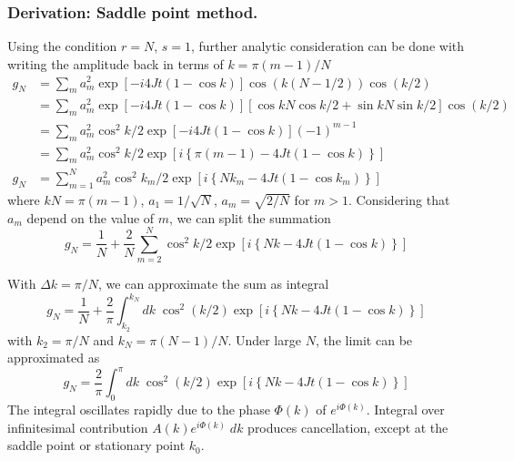 \documentclass[../../../main.tex]{subfiles}
\begin{document}
\subsubsection{Derivation: Saddle point method.}
Using the condition $r=N$, $s=1$, further analytic consideration can be done with writing the amplitude back in terms of $k = \pi(m-1)/N$
\begin{align*}
    g_N
     & = \sum_{m } a_m ^ 2 \exp \left[ -i4Jt(1 - \cos k) \right] \cos (k(N-1/2)) \cos (k/2)                                     \\
     & = \sum_{m } a_m ^ 2 \exp \left[ -i4Jt(1 - \cos k) \right] \left[ \cos kN \cos k/2 + \sin kN \sin k/2 \right]  \cos (k/2) \\
     & = \sum_{m } a_m ^ 2\cos^2 k/2 \exp \left[ -i4Jt(1 - \cos k) \right](-1)^{m-1}                                            \\
     & = \sum_{m } a_m ^ 2\cos^2 k/2 \exp \left[i \left\{\pi(m-1) - 4Jt (1-\cos k)  \right\}  \right]                           \\
    g_N
     & = \sum_{m =1} ^{N} a_m ^ 2\cos^2 k_m/2 \exp \left[i \left\{Nk_m - 4Jt (1-\cos k_m)  \right\}  \right]
\end{align*}
where $kN = \pi (m-1)$, $a_1 = 1/\sqrt{N}$, $a_m = \sqrt{2/N}$ for $m>1$.
Considering that $a_m$ depend on the value of $m$, we can split the summation
\begin{equation*}
    g_N = \frac{1}{N} + \frac{2 }{N }\sum_{m=2 } ^{N} \cos^2 k/2 \exp \left[i \left\{Nk - 4Jt (1-\cos k)  \right\}  \right]
\end{equation*}

With $\Delta k = \pi /N$, we can approximate the sum as integral
\begin{equation*}
    g_N = \frac{1 }{N} +  \frac{2}{\pi}\int_{k_2} ^{k_N} dk\;  \cos^2 (k/2) \exp \left[i \left\{Nk - 4Jt (1-\cos k)  \right\}  \right]
\end{equation*}
with  $k_\text{2} = \pi/N$ and $k_N = \pi(N-1)/N$.
Under large $N$, the limit can be approximated as
\begin{equation*}
    g_N = \frac{2}{\pi} \int_{0} ^{\pi} dk\; \cos^2 (k/2) \exp \left[i \left\{Nk - 4Jt (1-\cos k)  \right\}  \right]
\end{equation*}
The  integral oscillates rapidly due to the phase $\Phi(k) $ of $e ^{i\Phi(k)}$.
Integral over infinitesimal contribution $A(k) e ^{i \Phi(k)} \;dk$ produces cancellation, except at the saddle point or stationary point $k_0$.
\end{document}
